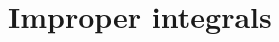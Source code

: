 \documentclass[../book/calcnotes.tex]{subfiles}
\begin{document}
\section{Improper integrals}
\label{sec:improper-int}

\begin{exercises}
\end{exercises}
\end{document}
